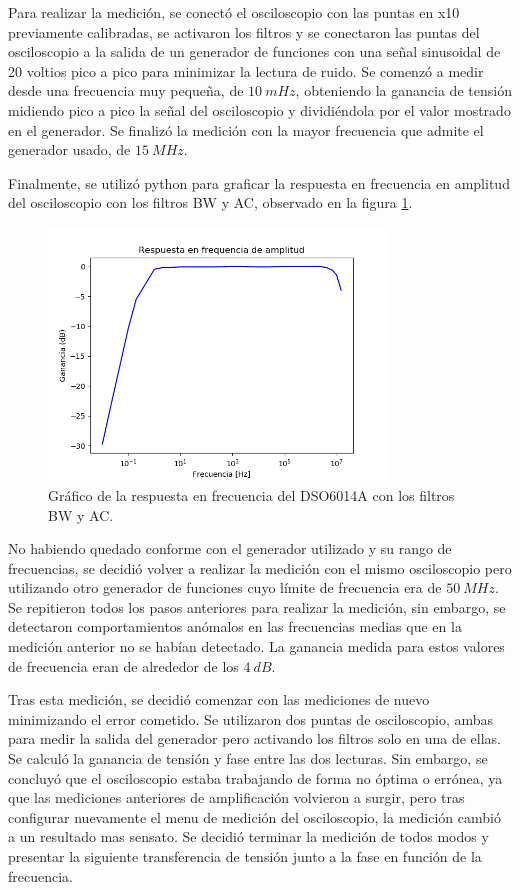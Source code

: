 \documentclass[11pt, a4paper]{article}
\begin{document}
Para realizar la medición, se conectó el osciloscopio con las puntas en x10 previamente calibradas, se activaron los filtros y se conectaron las puntas del osciloscopio a la salida de un generador de funciones con una señal sinusoidal de 20 voltios pico a pico para minimizar la lectura de ruido. Se comenzó a medir desde una frecuencia muy pequeña, de $10 \ mHz$, obteniendo la ganancia de tensión midiendo pico a pico la señal del osciloscopio y dividiéndola por el valor mostrado en el generador. Se finalizó la medición con la mayor frecuencia que admite el generador usado, de $15 \ MHz$.

Finalmente, se utilizó python para graficar la respuesta en frecuencia en amplitud del osciloscopio con los filtros BW y AC, observado en la figura \ref{graf:resp_freq_osci}.

\begin{figure}[H]
	\centering
	\includegraphics[width=0.8\textwidth]{resp_freq_osci.png}
	\caption{Gráfico de la respuesta en frecuencia del DSO6014A con los filtros BW y AC.} 
	\label{graf:resp_freq_osci}
\end{figure}

No habiendo quedado conforme con el generador utilizado y su rango de frecuencias, se decidió volver a realizar la medición con el mismo osciloscopio pero utilizando otro generador de funciones cuyo límite de frecuencia era de $50 \ MHz$. Se repitieron todos los pasos anteriores para realizar la medición, sin embargo, se detectaron comportamientos anómalos en las frecuencias medias que en la medición anterior no se habían detectado. La ganancia medida para estos valores de frecuencia eran de alrededor de los $4 \ dB$.

Tras esta medición, se decidió comenzar con las mediciones de nuevo minimizando el error cometido. Se utilizaron dos puntas de osciloscopio, ambas para medir la salida del generador pero activando los filtros solo en una de ellas. Se calculó la ganancia de tensión y fase entre las dos lecturas. Sin embargo, se concluyó que el osciloscopio estaba trabajando de forma no óptima o errónea, ya que las mediciones anteriores de amplificación volvieron a surgir, pero tras configurar nuevamente el menu de medición del osciloscopio, la medición cambió a un resultado mas sensato. Se decidió terminar la medición de todos modos y presentar la siguiente transferencia de tensión junto a la fase en función de la frecuencia.
\end{document}
